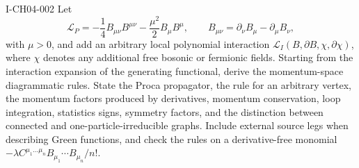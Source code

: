 \begin{exercise}{I-CH04-002}
Let
\begin{equation*}
 \mathcal L_P=-\frac14B_{\mu\nu}B^{\mu\nu}
 -\frac{\mu^2}{2}B_\mu B^\mu,
 \qquad B_{\mu\nu}=\partial_\nu B_\mu-\partial_\mu B_\nu,
\end{equation*}
with $\mu>0$, and add an arbitrary local polynomial interaction
$\mathcal L_I(B,\partial B,\chi,\partial\chi)$, where $\chi$ denotes any
additional free bosonic or fermionic fields.  Starting from the interaction
expansion of the generating functional, derive the momentum-space
diagrammatic rules.  State the Proca propagator, the rule for an arbitrary
vertex, the momentum factors produced by derivatives, momentum conservation,
loop integration, statistics signs, symmetry factors, and the distinction
between connected and one-particle-irreducible graphs.  Include external
source legs when describing Green functions, and check the rules on a
derivative-free monomial $-\lambda C^{\mu_1\ldots\mu_n}
B_{\mu_1}\cdots B_{\mu_n}/n!$.
\end{exercise}
